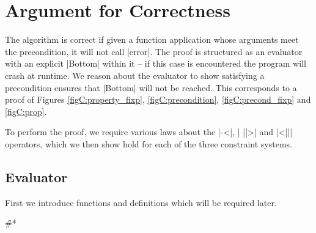 \begin{comment}
instance Eq Val
instance Eq Expr

alt :: Alt -> Prop (Sat a)
pre' :: String -> [Expr] -> Prop (Sat Expr)
sub :: ([VarName],[Expr])

-- for BP
anys :: String -> Constraint
\end{code}

\h{#mp}\begin{code}
-- for MP
type Constraint = [ValMP]
data ValMP = [Pattern] :* [Pattern] | Any
data Pattern = Pattern CtorName [ValMP]
complete :: CtorName -> Pattern
nonRecs :: CtorName -> [Int]
\end{code}
\end{comment}


\section{Argument for Correctness}
\label{secC:correct}

\newcommand{\lemma}[1]{(\textit{#1})}
\newcommand{\theorem}[2]{#2 \hspace{5mm} \lemma{#1} \\}
\newcommand{\proof}[2][]{\paragraph{\lemma{#2} \textsf{#1}}}

The algorithm is correct if given a function application whose arguments meet the precondition, it will not call |error|. The proof is structured as an evaluator with an explicit |Bottom| within it -- if this case is encountered the program will crash at runtime. We reason about the evaluator to show satisfying a precondition ensures that |Bottom| will not be reached. This corresponds to a proof of Figures \ref{figC:property_fixp}, \ref{figC:precondition}, \ref{figC:precond_fixp} and \ref{figC:prop}.

To perform the proof, we require various laws about the |-<|, | ||>| and |<||| operators, which we then show hold for each of the three constraint systems.

\subsection{Evaluator}

First we introduce functions and definitions which will be required later.

\h{#*}

